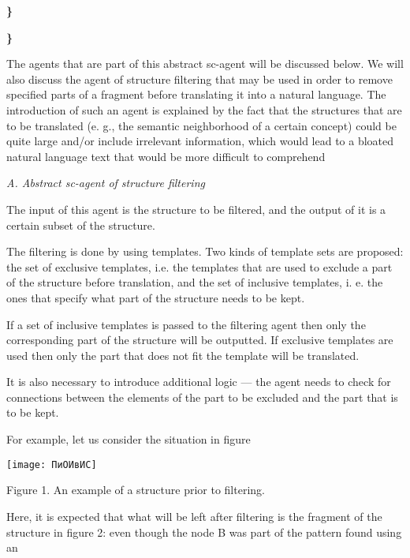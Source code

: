 \documentclass[9pt, a4paper]{article}
\begin{document}
\newpage
\begin{minipage}{0.48\textwidth}
\vspace{8mm}
\hspace{3cm}
\textbf{\}}

\hspace{1cm}
\textbf{\}}

\parindent 2mm
\normalsize {The agents that are part of this abstract sc-agent will
be discussed below. We will also discuss the agent of
structure filtering that may be used in order to remove
specified parts of a fragment before translating it into
a natural language. The introduction of such an agent
is explained by the fact that the structures that are
to be translated (e. g., the semantic neighborhood of
a certain concept) could be quite large and/or include
irrelevant information, which would lead to a bloated
natural language text that would be more difficult to
comprehend}

\vspace{2mm}
\small{\textit{A. Abstract sc-agent of structure filtering}}
\vspace{2mm}


The input of this agent is the structure to be filtered,
and the output of it is a certain subset of the structure.


\normalsize{The filtering is done by using templates. Two kinds of
template sets are proposed: the set of exclusive templates,
i.e. the templates that are used to exclude a part of
the structure before translation, and the set of inclusive
templates, i. e. the ones that specify what part of the
structure needs to be kept.


If a set of inclusive templates is passed to the filtering
agent then only the corresponding part of the structure
will be outputted. If exclusive templates are used then
only the part that does not fit the template will be
translated.


It is also necessary to introduce additional logic —
the agent needs to check for connections between the
elements of the part to be excluded and the part that is
to be kept.


For example, let us consider the situation in figure}
    
\texttt{[image: ПиОИвИС]}
\begin{center}
    \footnotesize{Figure 1. An example of a structure prior to filtering.}
\end{center}
\vspace{5mm}

\normalsize{Here, it is expected that what will be left after filtering
is the fragment of the structure in figure 2: even though
the node B was part of the pattern found using an}

\end{minipage}
\end{document}
